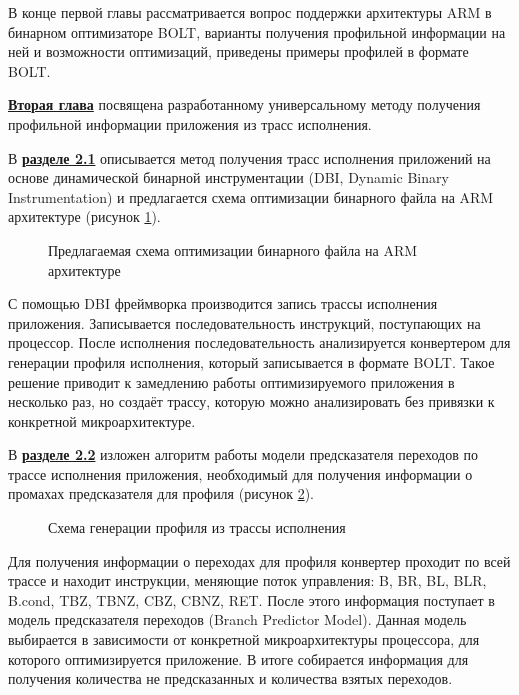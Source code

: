 В конце первой главы рассматривается вопрос поддержки архитектуры ARM в бинарном оптимизаторе BOLT, варианты получения профильной информации на ней и возможности оптимизаций, приведены примеры профилей в формате BOLT.

\underline{\textbf{Вторая глава}} посвящена разработанному универсальному методу получения профильной информации приложения из трасс исполнения.

В \underline{\textbf{разделе 2.1}} описывается метод получения трасс исполнения приложений на основе динамической бинарной инструментации (DBI, Dynamic Binary Instrumentation) и предлагается схема оптимизации бинарного файла на ARM архитектуре (рисунок \cref{fig:SugOpt}).

\begin{figure}[!h]
    \centerfloat{
        \texttt{[image: 9]}
    }
    \caption{Предлагаемая схема оптимизации бинарного файла на ARM архитектуре}\label{fig:SugOpt}
\end{figure}

С помощью DBI фреймворка производится запись трассы исполнения приложения. Записывается последовательность инструкций, поступающих на процессор. После исполнения последовательность анализируется конвертером для генерации профиля исполнения, который записывается в формате BOLT. Такое решение приводит к замедлению работы оптимизируемого приложения в несколько раз, но создаёт трассу, которую можно анализировать без привязки к конкретной микроархитектуре.

В \underline{\textbf{разделе 2.2}} изложен алгоритм работы модели предсказателя переходов по трассе исполнения приложения, необходимый для получения информации о промахах предсказателя для профиля (рисунок \cref{fig:ProfTrace}).

\begin{figure}[!h]
    \centerfloat{
        \texttt{[image: 10]}
    }
    \caption{Схема генерации профиля из трассы исполнения}\label{fig:ProfTrace}
\end{figure}

Для получения информации о переходах для профиля конвертер проходит по всей трассе и находит инструкции, меняющие поток управления: B, BR, BL, BLR, B.cond, TBZ, TBNZ, CBZ, CBNZ, RET. После этого информация поступает в модель предсказателя переходов (Branch Predictor Model). Данная модель выбирается в зависимости от конкретной микроархитектуры процессора, для которого оптимизируется приложение. В итоге собирается информация для получения количества не предсказанных и количества взятых переходов.

